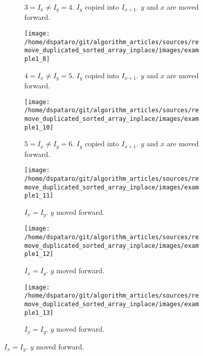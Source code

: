 \begin{figure}
\begin{subfigure}[t]{0.49\textwidth}
		\vspace*{-8mm}
		\caption{$3 = I_x \neq I_y = 4$. $I_y$ copied into $I_{x+1}$. $y$ and $x$ are moved forward.}
		\label{fig:remove_duplicated_sorted_array_inplace:example1_6}
	 \end{subfigure}
	 \hfill
	 \begin{subfigure}[t]{0.49\textwidth}
		\texttt{[image: /home/dspataro/git/algorithm\_articles/sources/remove\_duplicated\_sorted\_array\_inplace/images/example1\_8]}
		\vspace*{-8mm}
		\caption{$4 = I_x \neq I_y = 5$. $I_y$ copied into $I_{x+1}$. $y$ and $x$ are moved forward.}
		\label{fig:remove_duplicated_sorted_array_inplace:example1_6}
	 \end{subfigure}
	 \hfill
	 \begin{subfigure}[t]{0.49\textwidth}
		\texttt{[image: /home/dspataro/git/algorithm\_articles/sources/remove\_duplicated\_sorted\_array\_inplace/images/example1\_10]}
		\vspace*{-8mm}
		\caption{$5 = I_x \neq I_y = 6$. $I_y$ copied into $I_{x+1}$. $y$ and $x$ are moved forward.}
		\label{fig:remove_duplicated_sorted_array_inplace:example1_6}
	 \end{subfigure}
	 \hfill
	 \begin{subfigure}[t]{0.49\textwidth}
		\texttt{[image: /home/dspataro/git/algorithm\_articles/sources/remove\_duplicated\_sorted\_array\_inplace/images/example1\_11]}
		\vspace*{-8mm}
		\caption{$I_x = I_y$. $y$ moved forward.}
		\label{fig:remove_duplicated_sorted_array_inplace:example1_6}
	 \end{subfigure}
	 \hfill
	 \begin{subfigure}[t]{0.49\textwidth}
		\texttt{[image: /home/dspataro/git/algorithm\_articles/sources/remove\_duplicated\_sorted\_array\_inplace/images/example1\_12]}
		\caption{$I_x = I_y$. $y$ moved forward.}
		\label{fig:remove_duplicated_sorted_array_inplace:example1_6}
	 \end{subfigure}
	 \hfill
	 \begin{subfigure}[t]{0.49\textwidth}
		\texttt{[image: /home/dspataro/git/algorithm\_articles/sources/remove\_duplicated\_sorted\_array\_inplace/images/example1\_13]}
		\vspace*{-8mm}
		\caption{$I_x = I_y$. $y$ moved forward.}
		\label{fig:remove_duplicated_sorted_array_inplace:example1_6}
	 \end{subfigure}
	 \hfill

\end{figure}
